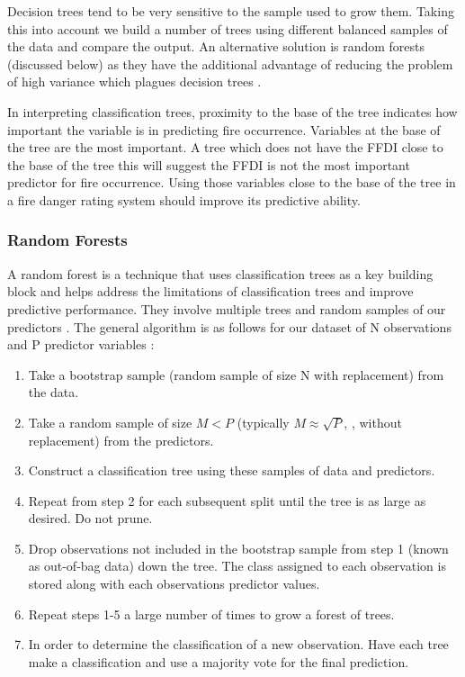 \documentclass[11pt,a4paper]{article}
\begin{document}
Decision trees tend to be very sensitive to the sample used to grow them. Taking this into account we build a number of trees using different balanced samples of the data and compare the output. An alternative solution is random forests (discussed below) as they have the additional advantage of reducing the problem of high variance which plagues decision trees \citep{james13}.

In interpreting classification trees, proximity to the base of the tree indicates how important the variable is in predicting fire occurrence. Variables at the base of the tree are the most important. A tree which does not have the FFDI close to the base of the tree this will suggest the FFDI is not the most important predictor for fire occurrence. Using those variables close to the base of the tree in a fire danger rating system should improve its predictive ability.



\subsubsection{Random Forests}

A random forest is a technique that uses classification trees as a key building block and helps address the limitations of classification trees and improve predictive performance. They involve multiple trees and random samples of our predictors \citep{berk08}.
The general algorithm is as follows for our dataset of N observations and P predictor variables \citep{berk08, varian14}:
\begin{enumerate}
  \item Take a bootstrap sample (random sample of size N with replacement) from the data.
  \item Take a random sample of size $M < P$ (typically $M \approx \sqrt{P}$, \cite{james13}, without replacement) from the predictors.
  \item Construct a classification tree using these samples of data and predictors.
  \item Repeat from step 2 for each subsequent split until the tree is as large as desired. Do not prune.
  \item Drop observations not included in the bootstrap sample from step 1 (known as out-of-bag data) down the tree. The class assigned to each observation is stored along with each observations predictor values.
  \item Repeat steps 1-5 a large number of times to grow a forest of trees.
  \item In order to determine the classification of a new observation. Have each tree make a classification and use a majority vote for the final prediction.
\end{enumerate}
\end{document}
